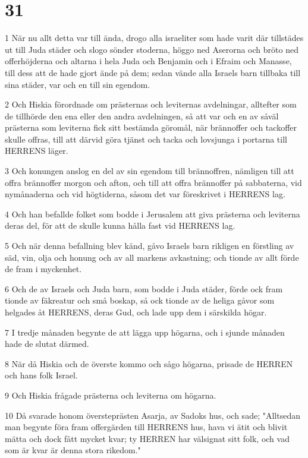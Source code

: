 \chapter{31}

\par 1 När nu allt detta var till ända, drogo alla israeliter som hade varit där tillstädes ut till Juda städer och slogo sönder stoderna, höggo ned Aserorna och bröto ned offerhöjderna och altarna i hela Juda och Benjamin och i Efraim och Manasse, till dess att de hade gjort ände på dem; sedan vände alla Israels barn tillbaka till sina städer, var och en till sin egendom.
\par 2 Och Hiskia förordnade om prästernas och leviternas avdelningar, alltefter som de tillhörde den ena eller den andra avdelningen, så att var och en av såväl prästerna som leviterna fick sitt bestämda göromål, när brännoffer och tackoffer skulle offras, till att därvid göra tjänst och tacka och lovsjunga i portarna till HERRENS läger.
\par 3 Och konungen anslog en del av sin egendom till brännoffren, nämligen till att offra brännoffer morgon och afton, och till att offra brännoffer på sabbaterna, vid nymånaderna och vid högtiderna, såsom det var föreskrivet i HERRENS lag.
\par 4 Och han befallde folket som bodde i Jerusalem att giva prästerna och leviterna deras del, för att de skulle kunna hålla fast vid HERRENS lag.
\par 5 Och när denna befallning blev känd, gåvo Israels barn rikligen en förstling av säd, vin, olja och honung och av all markens avkastning; och tionde av allt förde de fram i myckenhet.
\par 6 Och de av Israels och Juda barn, som bodde i Juda städer, förde ock fram tionde av fäkreatur och små boskap, så ock tionde av de heliga gåvor som helgades åt HERRENS, deras Gud, och lade upp dem i särskilda högar.
\par 7 I tredje månaden begynte de att lägga upp högarna, och i sjunde månaden hade de slutat därmed.
\par 8 När då Hiskia och de överste kommo och sågo högarna, prisade de HERREN och hans folk Israel.
\par 9 Och Hiskia frågade prästerna och leviterna om högarna.
\par 10 Då svarade honom översteprästen Asarja, av Sadoks hus, och sade; "Alltsedan man begynte föra fram offergärden till HERRENS hus, hava vi ätit och blivit mätta och dock fått mycket kvar; ty HERREN har välsignat sitt folk, och vad som är kvar är denna stora rikedom."

